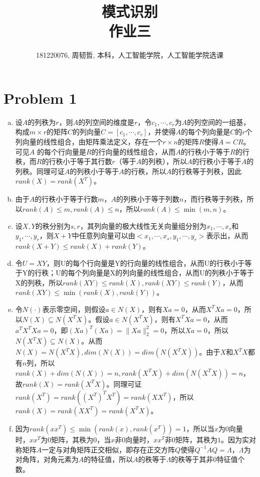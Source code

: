 \documentclass[a4paper,UTF8]{article}
\numberwithin{equation}{section}
\begin{document}
\title{模式识别\\
作业三}
\author{181220076, 周韧哲, 本科，人工智能学院，人工智能学院选课}
\maketitle

\section*{Problem 1}
\begin{enumerate}[(a)]
	\item 设$A$的列秩为$r$，则$A$的列空间的维度是$r$，令$c_1,\cdots,c_r$为$A$的列空间的一组基，构成$m\times r$的矩阵$C$的列向量$C=[c_1,\cdots,c_r]$，并使得$A$的每个列向量是$C$的$r$个列向量的线性组合，由矩阵乘法定义，存在一个$r\times n$的矩阵$R$使得$A=CR$。可见$A$ 的每个行向量是$R$的行向量的线性组合，从而$A$的行秩小于等于$R$的行秩，而$R$的行秩小于等于其行数$r$（等于$A$的列秩），所以$A$的行秩小于等于$A$的列秩。同理可证$A$的列秩小于等于$A$的行秩，所以$A$的行秩等于列秩，因此$rank(X)=rank(X^T)$。
	\item 由于$A$的行秩小于等于行数$m$，$A$的列秩小于等于列数$n$，而行秩等于列秩，所以$rank(A)\leq m, rank(A)\leq n$，所以$rank(A)\leq \min(m,n)$。
	\item 设$X,Y$的秩分别为$s,r$，其列向量的极大线性无关向量组分别为$x_1,\cdots,x_s$和$y_1,\cdots,y_r$，则$X+Y$中任意列向量可以由$<x_1,\cdots,x_s,y_1,\cdots,y_r>$表示出，从而$rank(X+Y)\leq rank(X)+rank(Y)$。
	\item 令$U=XY$，则U的每个行向量是Y的行向量的线性组合，从而U的行秩小于等于Y的行秩；U的每个列向量是X的列向量的线性组合，从而U的列秩小于等于X的列秩，所以$rank(XY)\leq rank(X),rank(XY)\leq rank(Y)$，从而$rank(XY)\leq\min(rank(X), rank(Y))$。
	\item 令$N(\cdot)$表示零空间，则假设$a\in N(X)$，则有$Xa=0$，从而$X^TXa=0$，所以$N(X)\subseteq N(X^TX)$。假设$a\in N(X^TX)$，则有$X^TXa=0$，从而$a^TX^TXa=0$，即$(Xa)^T(Xa)=\|Xa\|_2^2=0$，所以$Xa=0$，所以$N(X^TX)\subseteq N(X)$。从而$N(X)=N(X^TX),dim(N(X))=dim(N(X^TX))$。由于$X$和$X^TX$都有$n$列，所以$rank(X)+dim(N(X))=n, rank(X^TX)+dim(N(X^TX))=n$，故$rank(X)=rank(X^TX)$。同理可证$rank(X^T)=rank((X^T)^TX^T)=rank(XX^T)$，所以$rank(X)=rank(XX^T)=rank(X^TX)$。
	\item 因为$rank(xx^T)\leq \min(rank(x),rank(x^T))=1$，所以当$x$为$0$向量时，$xx^T$为$0$矩阵，其秩为$0$，当$x$非$0$向量时，$xx^T$非$0$矩阵，其秩为$1$。因为实对称矩阵$A$一定与对角矩阵正交相似，即存在正交方阵$Q$使得$Q^{-1}AQ=\Lambda$，$\Lambda$为对角阵，对角元素为$A$的特征值，所以$A$的秩等于$\Lambda$的秩等于其非$0$特征值个数。
\end{enumerate}
\end{document}
